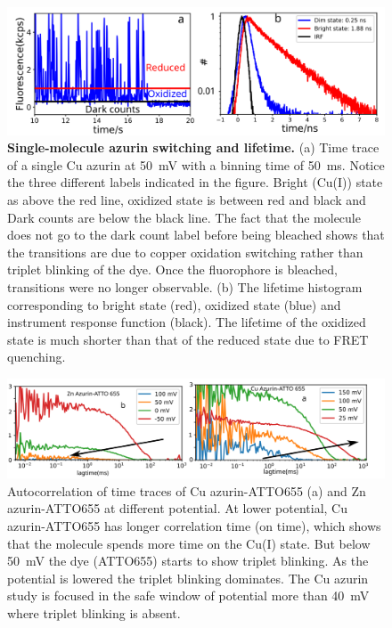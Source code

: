 \begin{figure}
  \centering
  \includegraphics[width=\textwidth]{lifetime}
  \makeatletter
  \renewcommand{\fnum@figure}{\figurename~S\thefigure}
  \makeatother
  \caption{\textbf{Single-molecule azurin switching and lifetime.} (a) Time trace of a single Cu azurin at \SI{50}{\mV} with a binning time of \SI{50}{\ms}.
  Notice the three different labels indicated in the figure.
  Bright (Cu(I)) state as above the red line, oxidized state is between red and black and Dark counts are below the black line.
  The fact that the molecule does not go to the dark count label before being bleached shows that the transitions are due to copper oxidation switching rather than triplet blinking of the dye.
  Once the fluorophore is bleached, transitions were no longer observable.
  (b) The lifetime histogram corresponding to bright state (red), oxidized state (blue) and instrument response function (black).
  The lifetime of the oxidized state is much shorter than that of the reduced state due to FRET quenching.}
  \label{SIfig: lifetime}
\end{figure}
\begin{figure}[ht]
  \centering
  \includegraphics[width=\textwidth]{fcs_comparision}
  \makeatletter
  \renewcommand{\fnum@figure}{\figurename~S\thefigure}
  \makeatother
  \caption{Autocorrelation of time traces of Cu azurin-ATTO655 (a) and Zn azurin-ATTO655 at different potential. 
  At lower potential, Cu azurin-ATTO655 has longer correlation time (on time), which shows that the molecule spends more time on the Cu(I) state.
  But below \SI{50}{\mV} the dye (ATTO655) starts to show triplet blinking.
  As the potential is lowered the triplet blinking dominates.
  The Cu azurin study is focused in the safe window of potential more than \SI{40}{\mV} where triplet blinking is absent.}
  \label{SIfig:fcscomparision}
\end{figure}
